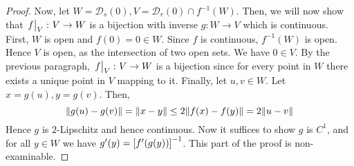 \begin{proof}
	Now, let \( W = \mathcal D_s(0), V = \mathcal D_r(0) \cap f^{-1}(W) \).
	Then, we will now show that \( \eval{f}_V \colon V \to W \) is a bijection with inverse \( g \colon W \to V \) which is continuous.
	First, \( W \) is open and \( f(0) = 0 \in W \).
	Since \( f \) is continuous, \( f^{-1}(W) \) is open.
	Hence \( V \) is open, as the intersection of two open sets.
	We have \( 0 \in V \).
	By the previous paragraph, \( \eval{f}_V \colon V \to W \) is a bijection since for every point in \( W \) there exists a unique point in \( V \) mapping to it.
	Finally, let \( u, v \in W \).
	Let \( x = g(u), y = g(v) \).
	Then,
	\[
		\norm{g(u) - g(v)} = \norm{x - y} \leq 2 \norm{f(x) - f(y)} = 2\norm{u - v}
	\]
	Hence \( g \) is \( 2 \)-Lipschitz and hence continuous.
	Now it suffices to show \( g \) is \( C^1 \), and for all \( y \in W \) we have \( g'(y) = \qty[f'(g(y))]^{-1} \).
	This part of the proof is non-examinable.
\end{proof}
